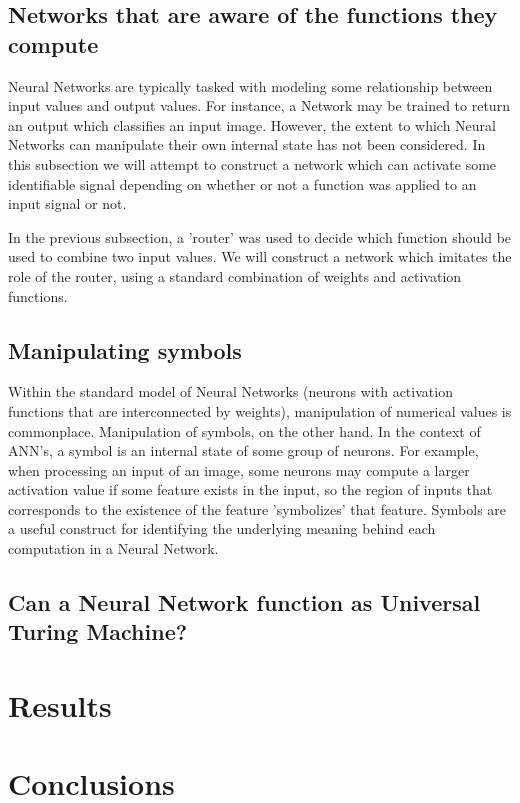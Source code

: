 \documentclass{article}
\begin{document}
	
	\subsection{Networks that are aware of the functions they compute}
	
		Neural Networks are typically tasked with modeling some relationship between input values and output values. For instance, a Network may be trained to return an output which classifies an input image. However, the extent to which Neural Networks can manipulate their own internal state has not been considered. In this subsection we will attempt to construct a network which can activate some identifiable signal depending on whether or not a function was applied to an input signal or not. 
		
		In the previous subsection, a 'router' was used to decide which function should be used to combine two input values. We will construct a network which imitates the role of the router, using a standard combination of weights and activation functions.
	
	\subsection{Manipulating symbols}
	
		Within the standard model of Neural Networks (neurons with activation functions that are interconnected by weights), manipulation of numerical values is commonplace. Manipulation of symbols, on the other hand. In the context of ANN's, a symbol is an internal state of some group of neurons. For example, when processing an input of an image, some neurons may compute a larger activation value if some feature exists in the input, so the region of inputs that corresponds to the existence of the feature 'symbolizes' that feature. Symbols are a useful construct for identifying the underlying meaning behind each computation in a Neural Network.
		
	\subsection{Can a Neural Network function as Universal Turing Machine?}
	
		
	
	\section{Results}
	
	\section{Conclusions}
	
	
	
\end{document}
